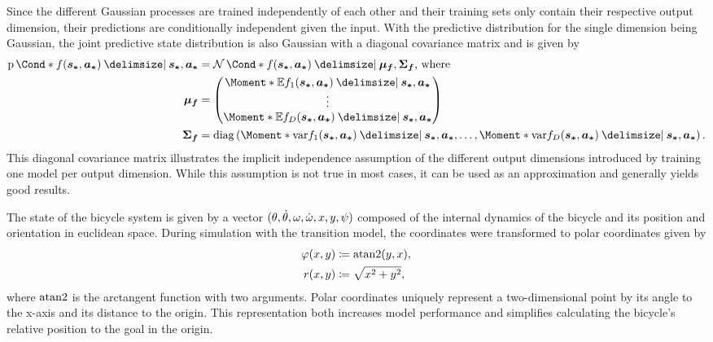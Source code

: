 Since the different Gaussian processes are trained independently of each other and their training sets only contain their respective output dimension, their predictions are conditionally independent given the input.
With the predictive distribution for the single dimension being Gaussian, the joint predictive state distribution is also Gaussian with a diagonal covariance matrix and is given by
\begin{align}
    \begin{split}
        \Prob*{f(\mat{s_\ast}, \mat{a_\ast}) \given \mat{s_\ast}, \mat{a_\ast}} &=
        \Gaussian*{f(\mat{s_\ast}, \mat{a_\ast}) \given \mat{\mu_f}, \mat{\Sigma_f}}\text{, where} \\
        \mat{\mu_f} &= \begin{pmatrix}
        \Moment*{\E}{f_1(\mat{s_\ast}, \mat{a_\ast}) \given \mat{s_\ast}, \mat{a_\ast}} \\
        \vdots \\
        \Moment*{\E}{f_D(\mat{s_\ast}, \mat{a_\ast}) \given \mat{s_\ast}, \mat{a_\ast}} \\
        \end{pmatrix} \\
        \mat{\Sigma_f} &= \diag\left(
            \Moment*{\var}{f_1(\mat{s_\ast}, \mat{a_\ast}) \given \mat{s_\ast}, \mat{a_\ast}},
            \ldots,
            \Moment*{\var}{f_D(\mat{s_\ast}, \mat{a_\ast}) \given \mat{s_\ast}, \mat{a_\ast}}
        \right).
    \end{split}
\end{align}
This diagonal covariance matrix illustrates the implicit independence assumption of the different output dimensions introduced by training one model per output dimension.
While this assumption is not true in most cases, it can be used as an approximation and generally yields good results.

The state of the bicycle system is given by a vector $(\theta, \dot{\theta}, \omega, \dot{\omega}, x, y, \psi)$ composed of the internal dynamics of the bicycle and its position and orientation in euclidean space.
During simulation with the transition model, the coordinates were transformed to polar coordinates given by
\begin{align}
    \begin{split}
        \varphi(x, y) &\coloneqq \operatorname{atan2}(y, x), \\
        r(x, y) &\coloneqq \sqrt{x^2 + y^2},
    \end{split}
\end{align}
where $\operatorname{atan2}$ is the arctangent function with two arguments.
Polar coordinates uniquely represent a two-dimensional point by its angle to the x-axis and its distance to the origin.
This representation both increases model performance and simplifies calculating the bicycle's relative position to the goal in the origin.

